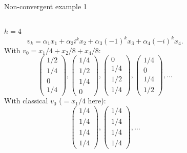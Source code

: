 \documentclass[10pt]{beamer}
\begin{document}
\begin{frame}{Non-convergent example 1}
  \begin{columns}
    \begin{column}{0.4\textwidth}
      $h=4$
      \[ v_k = \alpha_1 x_1 + \alpha_2 i^k x_2 + \alpha_3 (-1)^k x_3 + \alpha_4 (-i)^k x_4. \]
      With $v_0 = x_1/4 + x_2/8 + x_4/8$:
      \[
        \begin{pmatrix}
          1/2\\
          1/4\\
          0\\
          1/4
        \end{pmatrix},
        \begin{pmatrix}
          1/4\\
          1/2\\
          1/4\\
          0
        \end{pmatrix},
        \begin{pmatrix}
          0\\
          1/4\\
          1/2\\
          1/4
        \end{pmatrix},
        \begin{pmatrix}
          1/4\\
          0\\
          1/4\\
          1/2
        \end{pmatrix},\ldots
      \]
      With classical $v_0$ ($= x_1/4$ here):
      \[
        \begin{pmatrix}
          1/4\\
          1/4\\
          1/4\\
          1/4
        \end{pmatrix},
        \begin{pmatrix}
          1/4\\
          1/4\\
          1/4\\
          1/4
        \end{pmatrix},\ldots
      \]
    \end{column}
    \begin{column}{0.6\textwidth}
      \begin{center}
\end{center}
\end{column}
\end{columns}
\end{frame}
\end{document}
